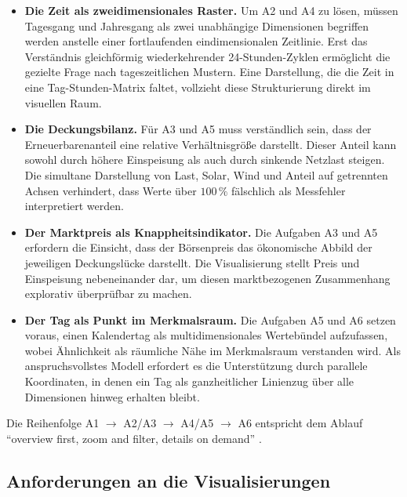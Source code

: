 \begin{itemize}
  \item[\textbf{M1}] \textbf{Die Zeit als zweidimensionales Raster.} Um A2 und A4 zu lösen, müssen Tagesgang und Jahresgang als zwei unabhängige Dimensionen begriffen werden anstelle einer fortlaufenden eindimensionalen Zeitlinie. Erst das Verständnis gleichförmig wiederkehrender 24-Stunden-Zyklen ermöglicht die gezielte Frage nach tageszeitlichen Mustern. Eine Darstellung, die die Zeit in eine Tag-Stunden-Matrix faltet, vollzieht diese Strukturierung direkt im visuellen Raum.
  \item[\textbf{M2}] \textbf{Die Deckungsbilanz.} Für A3 und A5 muss verständlich sein, dass der Erneuerbarenanteil eine relative Verhältnisgröße darstellt. Dieser Anteil kann sowohl durch höhere Einspeisung als auch durch sinkende Netzlast steigen. Die simultane Darstellung von Last, Solar, Wind und Anteil auf getrennten Achsen verhindert, dass Werte über $100\,\%$ fälschlich als Messfehler interpretiert werden.
  \item[\textbf{M3}] \textbf{Der Marktpreis als Knappheitsindikator.} Die Aufgaben A3 und A5 erfordern die Einsicht, dass der Börsenpreis das ökonomische Abbild der jeweiligen Deckungslücke darstellt. Die Visualisierung stellt Preis und Einspeisung nebeneinander dar, um diesen marktbezogenen Zusammenhang explorativ überprüfbar zu machen.
  \item[\textbf{M4}] \textbf{Der Tag als Punkt im Merkmalsraum.} Die Aufgaben A5 und A6 setzen voraus, einen Kalendertag als multidimensionales Wertebündel aufzufassen, wobei Ähnlichkeit als räumliche Nähe im Merkmalsraum verstanden wird. Als anspruchsvollstes Modell erfordert es die Unterstützung durch parallele Koordinaten, in denen ein Tag als ganzheitlicher Linienzug über alle Dimensionen hinweg erhalten bleibt.
\end{itemize}

Die Reihenfolge A1 $\rightarrow$ A2/A3 $\rightarrow$ A4/A5 $\rightarrow$ A6 entspricht dem Ablauf
\enquote{overview first, zoom and filter, details on demand} \cite{Shneiderman1996}.

\subsection{Anforderungen an die Visualisierungen}\label{sec:anforderungen}

